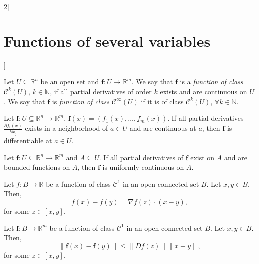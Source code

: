 \documentclass[class=article,10pt,crop=false]{standalone}
\begin{document}
\begin{multicols}{2}[\section{Functions of several variables}]
\begin{theorem}
\end{theorem}
\begin{definition}
Let $U\subseteq\mathbb{R}^n$ be an open set and $\boldsymbol{f}:U\rightarrow\mathbb{R}^m$. We say that $\boldsymbol{f}$ is a \textit{function of class $\mathcal{C}^k(U)$}, $k\in\mathbb{N}$, if all partial derivatives of order $k$ exists and are continuous on $U$. We say that $\boldsymbol{f}$ is \textit{function of class $\mathcal{C}^\infty(U)$} if it is of class $\mathcal{C}^k(U)$, $\forall k\in\mathbb{N}$.
\end{definition}
\begin{theorem}
Let $\boldsymbol{f}:U\subseteq\mathbb{R}^n\rightarrow\mathbb{R}^m$, $\boldsymbol{f}(x)=(f_1(x),\ldots,f_m(x))$. If all partial derivatives $\displaystyle \frac{\partial f_i(x)}{\partial x_j}$ exists in a neighborhood of $a\in U$ and are continuous at $a$, then $\boldsymbol{f}$ is differentiable at $a\in U$.
\end{theorem}
\begin{prop}
Let $\boldsymbol{f}:U\subseteq\mathbb{R}^n\rightarrow\mathbb{R}^m$ and $A\subseteq U$. If all partial derivatives of $\boldsymbol{f}$ exist on $A$ and are bounded functions on $A$, then $\boldsymbol{f}$ is uniformly continuous on $A$.
\end{prop}
\begin{theorem}
Let $f:B\rightarrow\mathbb{R}$ be a function of class $\mathcal{C}^1$ in an open connected set $B$. Let $x,y\in B$. Then, $$f(x)-f(y)=\nabla f(z)\cdot(x-y),$$ for some $z\in[x,y]$.
\end{theorem}
\begin{theorem}
Let $\boldsymbol{f}:B\rightarrow\mathbb{R}^m$ be a function of class $\mathcal{C}^1$ in an open connected set $B$. Let $x,y\in B$. Then, $$\|\boldsymbol{f}(x)-\boldsymbol{f}(y)\|\leq\|Df(z)\|\|x-y\|,$$ for some $z\in[x,y]$.
\end{theorem}

\end{multicols}
\end{document}
